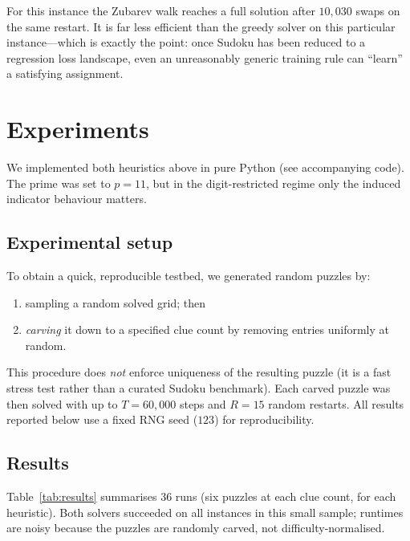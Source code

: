 \documentclass[11pt]{article}
\begin{document}
For this instance the Zubarev walk reaches a full solution after $10{,}030$ swaps on the same restart. It is far less efficient than the greedy solver on this particular instance---which is exactly the point: once Sudoku has been reduced to a regression loss landscape, even an unreasonably generic training rule can ``learn'' a satisfying assignment.

\section{Experiments}

We implemented both heuristics above in pure Python (see accompanying code). The prime was set to $p=11$, but in the digit-restricted regime only the induced indicator behaviour matters.

\subsection{Experimental setup}
To obtain a quick, reproducible testbed, we generated random puzzles by:
\begin{enumerate}
    \item sampling a random solved grid; then
    \item \emph{carving} it down to a specified clue count by removing entries uniformly at random.
\end{enumerate}
This procedure does \emph{not} enforce uniqueness of the resulting puzzle (it is a fast stress test rather than a curated Sudoku benchmark). Each carved puzzle was then solved with up to $T=60{,}000$ steps and $R=15$ random restarts.
All results reported below use a fixed RNG seed ($123$) for reproducibility.

\subsection{Results}
Table~\ref{tab:results} summarises 36 runs (six puzzles at each clue count, for each heuristic). Both solvers succeeded on all instances in this small sample; runtimes are noisy because the puzzles are randomly carved, not difficulty-normalised.
\end{document}
